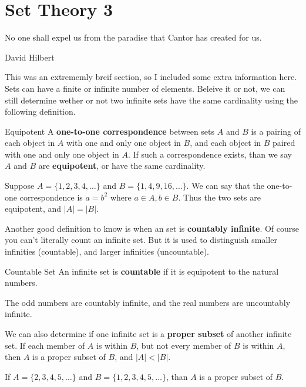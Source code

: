 \chapter{Set Theory 3}

\epigraph{No one shall expel us from the paradise that Cantor has created for us.}{David Hilbert}

This was an extrememly breif section, so I included some extra information here. Sets can have a finite or infinite number of elements. Beleive it or not, we can still determine wether or not two infinite sets have the same cardinality using the following definition.

\begin{boxdefine}{Equipotent}{}
	A {\bf one-to-one correspondence} between sets $A$ and $B$ is a pairing of each object in $A$ with one and only one object in $B$, and each object in $B$ paired with one and only one object in $A$. If such a correspondence exists, than we say $A$ and $B$ are {\bf equipotent}, or have the same cardinality.
\end{boxdefine}

\begin{boxexample}{}{}
	Suppose $A=\{1,2,3,4,\dots\}$ and $B=\{1,4,9,16,\dots\}$. We can say that the one-to-one correspondence is $a=b^2$ where $a \in A, b \in B$. Thus the two sets are equipotent, and $|A|=|B|$.
\end{boxexample}

Another good definition to know is when an set is {\bf countably infinite}. Of course you can't literally count an infinite set. But it is used to distinguish smaller infinities (countable), and larger infinities (uncountable).

\begin{boxdefine}{Countable Set}{}
	An infinite set is {\bf countable} if it is equipotent to the natural numbers. 
\end{boxdefine}

\begin{boxexample}{}{}
	The odd numbers are countably infinite, and the real numbers are uncountably infinite.
\end{boxexample}

We can also determine if one infinite set is a {\bf proper subset} of another infinite set. If each member of $A$ is within $B$, but not every member of $B$ is within $A$, then $A$ is a proper subset of $B$, and $|A| < |B|$.

\begin{boxexample}{}{}
	If $A=\{2,3,4,5,\dots\}$ and $B=\{1,2,3,4,5,\dots\}$, than $A$ is a proper subset of $B$.
\end{boxexample}

